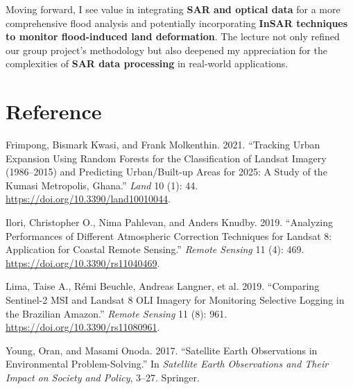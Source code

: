 \documentclass[
  letterpaper,
]{scrbook}
\newlength{\cslhangindent}
\newenvironment{CSLReferences}[2] %
 {\begin{list}{}{%
  \setlength{\itemindent}{0pt}
  \setlength{\leftmargin}{0pt}
  \setlength{\parsep}{0pt}
  \ifodd #1
   \setlength{\leftmargin}{\cslhangindent}
   \setlength{\itemindent}{-1\cslhangindent}
  \fi
  \setlength{\itemsep}{#2\baselineskip}}}
 {\end{list}}
\begin{document}
Moving forward, I see value in integrating \textbf{SAR and optical data}
for a more comprehensive flood analysis and potentially incorporating
\textbf{InSAR techniques to monitor flood-induced land deformation}. The
lecture not only refined our group project's methodology but also
deepened my appreciation for the complexities of \textbf{SAR data
processing} in real-world applications.

\section*{Reference}\label{reference-5}

\label{refs}
\begin{CSLReferences}{1}{0}
Frimpong, Bismark Kwasi, and Frank Molkenthin. 2021. {``Tracking Urban
Expansion Using Random Forests for the Classification of Landsat Imagery
(1986--2015) and Predicting Urban/Built-up Areas for 2025: A Study of
the Kumasi Metropolis, Ghana.''} \emph{Land} 10 (1): 44.
\url{https://doi.org/10.3390/land10010044}.

Ilori, Christopher O., Nima Pahlevan, and Anders Knudby. 2019.
{``Analyzing Performances of Different Atmospheric Correction Techniques
for {Landsat} 8: Application for Coastal Remote Sensing.''} \emph{Remote
Sensing} 11 (4): 469. \url{https://doi.org/10.3390/rs11040469}.

Lima, Taise A., Rémi Beuchle, Andreas Langner, et al. 2019. {``Comparing
Sentinel-2 MSI and Landsat 8 OLI Imagery for Monitoring Selective
Logging in the Brazilian Amazon.''} \emph{Remote Sensing} 11 (8): 961.
\url{https://doi.org/10.3390/rs11080961}.

Young, Oran, and Masami Onoda. 2017. {``Satellite Earth Observations in
Environmental Problem-Solving.''} In \emph{Satellite Earth Observations
and Their Impact on Society and Policy}, 3--27. Springer.

\end{CSLReferences}


\backmatter
\end{document}
